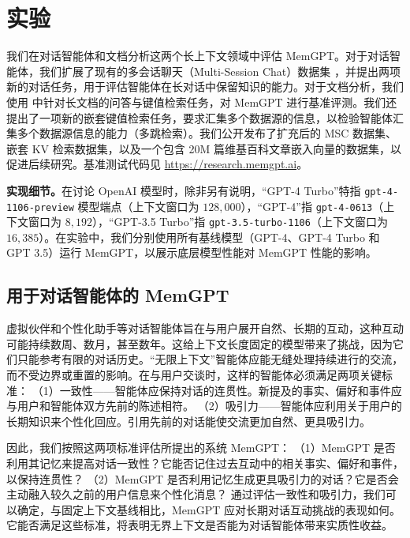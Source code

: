 \documentclass[UTF8,fontset=fandol,a4paper,11pt]{ctexart}
\newcommand{\website}{{\href{https://research.memgpt.ai}{https://research.memgpt.ai}}\xspace}
\newcommand{\ours}{MemGPT\xspace}
\begin{document}



\section{实验}
\label{sec:eval}

我们在对话智能体和文档分析这两个长上下文领域中评估 \ours。对于对话智能体，我们扩展了现有的多会话聊天（Multi-Session Chat）数据集 \cite{xu2021mscbeyond}，并提出两项新的对话任务，用于评估智能体在长对话中保留知识的能力。对于文档分析，我们使用 \cite{liu2023lostinmiddle} 中针对长文档的问答与键值检索任务，对 \ours 进行基准评测。我们还提出了一项新的嵌套键值检索任务，要求汇集多个数据源的信息，以检验智能体汇集多个数据源信息的能力（多跳检索）。我们公开发布了扩充后的 MSC 数据集、嵌套 KV 检索数据集，以及一个包含 20M 篇维基百科文章嵌入向量的数据集，以促进后续研究。基准测试代码见 \website。

\textbf{实现细节。}在讨论 OpenAI 模型时，除非另有说明，“GPT-4 Turbo”特指 \texttt{gpt-4-1106-preview} 模型端点（上下文窗口为 $128,000$），“GPT-4”指 \texttt{gpt-4-0613}（上下文窗口为 $8,192$），“GPT-3.5 Turbo”指 \texttt{gpt-3.5-turbo-1106}（上下文窗口为 $16,385$）。在实验中，我们分别使用所有基线模型（GPT-4、GPT-4 Turbo 和 GPT 3.5）运行 \ours，以展示底层模型性能对 \ours 性能的影响。






\subsection{用于对话智能体的 \ours}

虚拟伙伴和个性化助手等对话智能体旨在与用户展开自然、长期的互动，这种互动可能持续数周、数月，甚至数年。这给上下文长度固定的模型带来了挑战，因为它们只能参考有限的对话历史。“无限上下文”智能体应能无缝处理持续进行的交流，而不受边界或重置的影响。在与用户交谈时，这样的智能体必须满足两项关键标准：
（1）一致性——智能体应保持对话的连贯性。新提及的事实、偏好和事件应与用户和智能体双方先前的陈述相符。
（2）吸引力——智能体应利用关于用户的长期知识来个性化回应。引用先前的对话能使交流更加自然、更具吸引力。

因此，我们按照这两项标准评估所提出的系统 \ours：
（1）\ours 是否利用其记忆来提高对话一致性？它能否记住过去互动中的相关事实、偏好和事件，以保持连贯性？
（2）\ours 是否利用记忆生成更具吸引力的对话？它是否会主动融入较久之前的用户信息来个性化消息？
通过评估一致性和吸引力，我们可以确定，与固定上下文基线相比，\ours 应对长期对话互动挑战的表现如何。它能否满足这些标准，将表明无界上下文是否能为对话智能体带来实质性收益。
\end{document}
